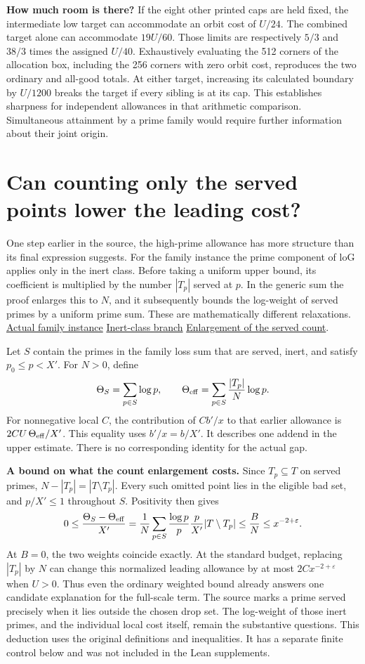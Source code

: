 \documentclass[12pt,letterpaper]{article}
\newcommand{\orig}[3]{\href{https://github.com/nousentllc/riemann-hypothesis/blob/40e56bab026552e089d7afcfeff08d2defb9c005/src/#1.lean\#L#2}{#3}}
\newcommand{\para}[1]{\par\medskip\noindent\textbf{#1}\quad}
\newcommand{\pagepart}[1]{\clearpage\section{#1}}
\begin{document}
\para{How much room is there?} If the eight other printed caps are held fixed, the intermediate low target can accommodate an orbit cost of \(U/24\). The combined target alone can accommodate \(19U/60\). Those limits are respectively \(5/3\) and \(38/3\) times the assigned \(U/40\). Exhaustively evaluating the 512 corners of the allocation box, including the 256 corners with zero orbit cost, reproduces the two ordinary and all-good totals. At either target, increasing its calculated boundary by \(U/1200\) breaks the target if every sibling is at its cap. This establishes sharpness for independent allowances in that arithmetic comparison. Simultaneous attainment by a prime family would require further information about their joint origin.

\pagepart{Can counting only the served points lower the leading cost?}
One step earlier in the source, the high-prime allowance has more structure than its final expression suggests. For the family instance the prime component of \(\mathrm{loG}\) applies only in the inert class. Before taking a uniform upper bound, its coefficient is multiplied by the number \(|T_p|\) served at \(p\). In the generic sum the proof enlarges this to \(N\), and it subsequently bounds the log-weight of served primes by a uniform prime sum. These are mathematically different relaxations.
\orig{Formalism/LocalToGlobal/GlobalTheory/SuppSat}{54}{Actual family instance}\quad
\orig{Formalism/SharpRestriction/GlobalTheoremInputs}{109}{Inert-class branch}\quad
\orig{Formalism/SizeWindowBrackets/ChainSlopeWindows/AdmissibleSchurLemma}{858}{Enlargement of the served count}.

Let \(S\) contain the primes in the family loss sum that are served, inert, and satisfy \(p_0\le p<X'\). For \(N>0\), define
\[
 \Theta_S=\sum_{p\in S}\log p,\qquad
 \Theta_{\rm eff}=\sum_{p\in S}\frac{|T_p|}{N}\log p .
\]
For nonnegative local \(C\), the contribution of \(Cb'/x\) to that earlier allowance is \(2CU\,\Theta_{\rm eff}/X'\). This equality uses \(b'/x=b/X'\). It describes one addend in the upper estimate. There is no corresponding identity for the actual gap.

\para{A bound on what the count enlargement costs.} Since \(T_p\subseteq T\) on served primes, \(N-|T_p|=|T\setminus T_p|\). Every such omitted point lies in the eligible bad set, and \(p/X'\le1\) throughout \(S\). Positivity then gives
\[
 0\le\frac{\Theta_S-\Theta_{\rm eff}}{X'}
  =\frac1N\sum_{p\in S}\frac{\log p}{p}\frac p{X'}|T\setminus T_p|
  \le\frac BN\le x^{-2+\varepsilon}.
\]
At \(B=0\), the two weights coincide exactly. At the standard budget, replacing \(|T_p|\) by \(N\) can change this normalized leading allowance by at most \(2C x^{-2+\varepsilon}\) when \(U>0\). Thus even the ordinary weighted bound already answers one candidate explanation for the full-scale term. The source marks a prime served precisely when it lies outside the chosen drop set. The log-weight of those inert primes, and the individual local cost itself, remain the substantive questions. This deduction uses the original definitions and inequalities. It has a separate finite control below and was not included in the Lean supplements.
\end{document}
